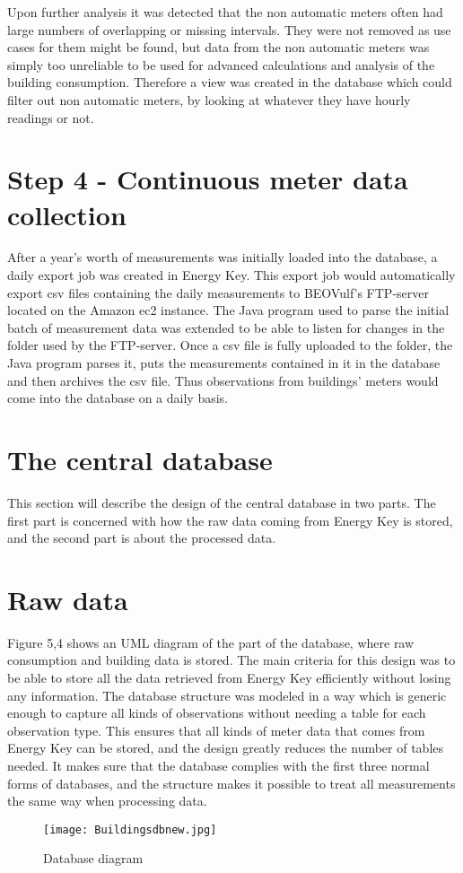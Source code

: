Upon further analysis it was detected that the non automatic meters often had large numbers of overlapping or missing intervals. They were not removed as use cases for them might be found, but data from the non automatic meters was simply too unreliable to be used for advanced calculations and analysis of the building consumption. Therefore a view was created in the database which could filter out non automatic meters, by looking at whatever they have hourly readings or not.
\section*{Step 4 - Continuous meter data collection}
After a year's worth of measurements was initially loaded into the database, a daily export job was created in Energy Key. This export job would automatically export csv files containing the daily measurements to BEOVulf’s FTP-server located on the Amazon ec2 instance. The Java program used to parse the initial batch of measurement data was extended to be able to listen for changes in the folder used by the FTP-server. Once a csv file is fully uploaded to the folder, the Java program parses it, puts the measurements contained in it in the database and then archives the csv file. Thus observations from buildings’ meters would come into the database on a daily basis.
\section{The central database}
This section will describe the design of the central database in two parts. The first part is concerned with how the raw data coming from Energy Key is stored, and the second part is about the processed data.
\section*{Raw data}
Figure 5,4 shows an UML diagram of the part of the database, where raw consumption and building data is stored. The main criteria for this design was to be able to store all the data retrieved from Energy Key efficiently without losing any information. The database structure was modeled in a way which is generic enough to capture all kinds of observations without needing a table for each observation type. This ensures that all kinds of meter data that comes from Energy Key can be stored, and the design greatly reduces the number of tables needed. It makes sure that the database complies with the first three normal forms of databases, and the structure makes it possible to treat all measurements the same way when processing data.
\begin{figure}
\texttt{[image: Buildingsdbnew.jpg]}
\caption{Database diagram}
\end{figure}

